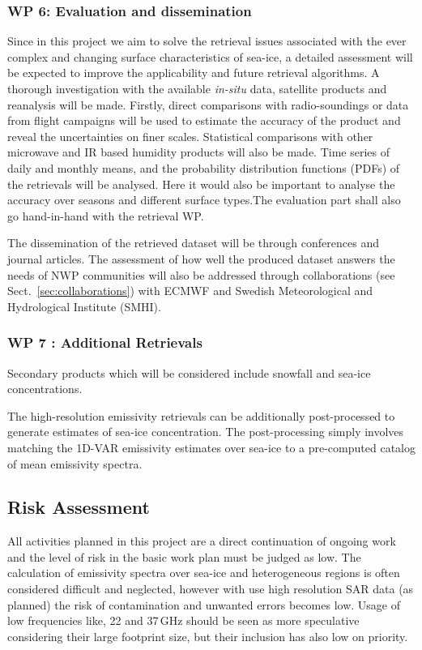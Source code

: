 \documentclass[12pt,oneside,a4paper]{article}
\begin{document}
\subsubsection*{WP 6: Evaluation and dissemination}
%
\label{sec:evaluation}
Since in this project we aim to solve the retrieval issues associated with the ever complex and changing surface characteristics of sea-ice, a detailed assessment will be expected to improve the applicability and future retrieval algorithms. A thorough investigation with the available \textit{in-situ} data, satellite products and reanalysis will be made. Firstly, direct comparisons with radio-soundings or data from flight campaigns will be used to estimate the accuracy of the product and reveal the uncertainties on finer scales. Statistical comparisons with other microwave and IR based humidity products  will also be made. Time series of daily and monthly means, and the probability distribution functions (PDFs) of the retrievals will be analysed. Here it would also be important to analyse the accuracy over seasons and different surface types.The evaluation part shall also go hand-in-hand with the retrieval WP.

The dissemination of the retrieved dataset will be through conferences and journal articles. The assessment of how well the produced dataset answers the needs of NWP communities will also be addressed through collaborations (see Sect.~\ref{sec:collaborations}) with ECMWF and Swedish Meteorological and Hydrological Institute (SMHI). 
\vspace{-1.0ex}
\subsubsection*{WP 7 : Additional Retrievals}
%
\label{sec:other_retrievals}

Secondary products which will be considered include snowfall and sea-ice concentrations.  


The high-resolution emissivity retrievals can be additionally post-processed to generate estimates of sea-ice concentration. The post-processing simply involves matching the 1D-VAR emissivity estimates over sea-ice to a pre-computed catalog of mean emissivity spectra. %

 
\subsection{Risk Assessment}
%
\label{sec:risk}
All activities planned in this project are a direct continuation of ongoing
work and the level of risk in the basic work plan must be judged as low. The
calculation of emissivity spectra over sea-ice and heterogeneous regions is
often considered difficult and neglected, however with use high resolution SAR
data (as planned) the risk of contamination and unwanted errors becomes low.
Usage of low frequencies like, 22 and 37\,GHz should be seen as more
speculative considering their large footprint size, but their inclusion has
also low on priority.
\end{document}
